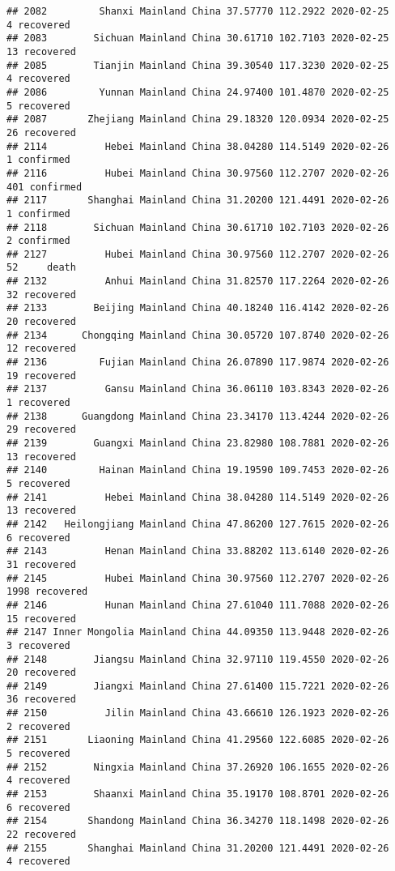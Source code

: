 \documentclass[
]{article}
\begin{document}
\begin{verbatim}
## 2082         Shanxi Mainland China 37.57770 112.2922 2020-02-25     4 recovered
## 2083        Sichuan Mainland China 30.61710 102.7103 2020-02-25    13 recovered
## 2085        Tianjin Mainland China 39.30540 117.3230 2020-02-25     4 recovered
## 2086         Yunnan Mainland China 24.97400 101.4870 2020-02-25     5 recovered
## 2087       Zhejiang Mainland China 29.18320 120.0934 2020-02-25    26 recovered
## 2114          Hebei Mainland China 38.04280 114.5149 2020-02-26     1 confirmed
## 2116          Hubei Mainland China 30.97560 112.2707 2020-02-26   401 confirmed
## 2117       Shanghai Mainland China 31.20200 121.4491 2020-02-26     1 confirmed
## 2118        Sichuan Mainland China 30.61710 102.7103 2020-02-26     2 confirmed
## 2127          Hubei Mainland China 30.97560 112.2707 2020-02-26    52     death
## 2132          Anhui Mainland China 31.82570 117.2264 2020-02-26    32 recovered
## 2133        Beijing Mainland China 40.18240 116.4142 2020-02-26    20 recovered
## 2134      Chongqing Mainland China 30.05720 107.8740 2020-02-26    12 recovered
## 2136         Fujian Mainland China 26.07890 117.9874 2020-02-26    19 recovered
## 2137          Gansu Mainland China 36.06110 103.8343 2020-02-26     1 recovered
## 2138      Guangdong Mainland China 23.34170 113.4244 2020-02-26    29 recovered
## 2139        Guangxi Mainland China 23.82980 108.7881 2020-02-26    13 recovered
## 2140         Hainan Mainland China 19.19590 109.7453 2020-02-26     5 recovered
## 2141          Hebei Mainland China 38.04280 114.5149 2020-02-26    13 recovered
## 2142   Heilongjiang Mainland China 47.86200 127.7615 2020-02-26     6 recovered
## 2143          Henan Mainland China 33.88202 113.6140 2020-02-26    31 recovered
## 2145          Hubei Mainland China 30.97560 112.2707 2020-02-26  1998 recovered
## 2146          Hunan Mainland China 27.61040 111.7088 2020-02-26    15 recovered
## 2147 Inner Mongolia Mainland China 44.09350 113.9448 2020-02-26     3 recovered
## 2148        Jiangsu Mainland China 32.97110 119.4550 2020-02-26    20 recovered
## 2149        Jiangxi Mainland China 27.61400 115.7221 2020-02-26    36 recovered
## 2150          Jilin Mainland China 43.66610 126.1923 2020-02-26     2 recovered
## 2151       Liaoning Mainland China 41.29560 122.6085 2020-02-26     5 recovered
## 2152        Ningxia Mainland China 37.26920 106.1655 2020-02-26     4 recovered
## 2153        Shaanxi Mainland China 35.19170 108.8701 2020-02-26     6 recovered
## 2154       Shandong Mainland China 36.34270 118.1498 2020-02-26    22 recovered
## 2155       Shanghai Mainland China 31.20200 121.4491 2020-02-26     4 recovered

\end{verbatim}
\end{document}
